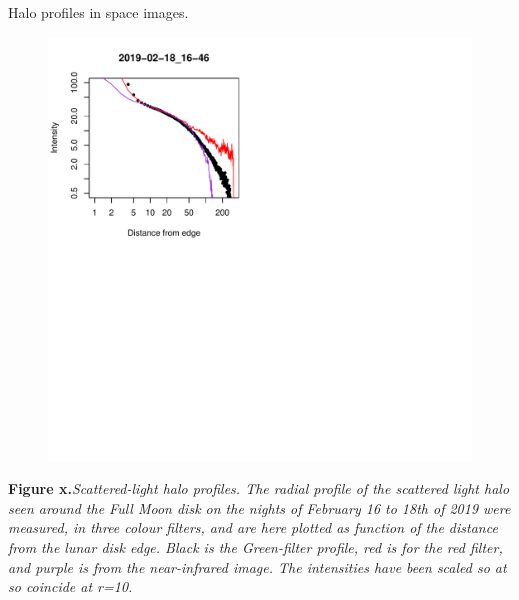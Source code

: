 \documentclass[final,hyperref={pdfpagelabels=false}]{beamer}
\begin{document}
\begin{frame}[t]
\begin{columns}[t]
\begin{column}{.23\textwidth}
\begin{block}{Halo profiles in space images.}
\begin{figure}
\includegraphics[scale=1.08,viewport=2 261 232 496,clip]{fig/slopes_compared_2019-02-18_16-46.pdf}
\end{figure}



\textbf{Figure x.}\textit{Scattered-light halo profiles. The radial profile of the scattered light halo seen around the Full Moon disk on the nights of February 16 to 18th of 2019 were measured, in three colour filters, and are here plotted as function of the distance from the lunar disk edge. Black is the Green-filter profile, red is for the red filter, and purple is from the near-infrared image. The intensities have been scaled so at so coincide at r=10.}



\end{block}




\end{column} %


\end{columns}
\end{frame}
\end{document}
